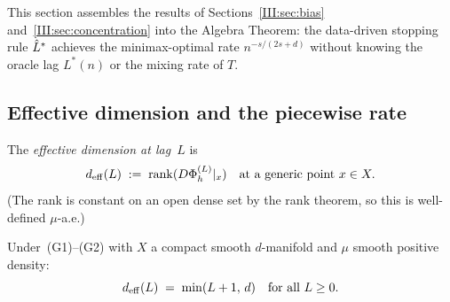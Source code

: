 This section assembles the results of Sections~\ref{III:sec:bias}
and~\ref{III:sec:concentration} into the Algebra Theorem: the data-driven stopping
rule $\hat{L}^*$ achieves the minimax-optimal rate $n^{-s/(2s+d)}$ without knowing
the oracle lag $L^*(n)$ or the mixing rate of $T$.

\subsection{Effective dimension and the piecewise rate}

\begin{definition}
\label{III:def:deff}
The \emph{effective dimension at lag~$L$} is
\[
  d_{\mathrm{eff}}(L) \;:=\; \operatorname{rank}(D\Phi_h^{(L)}|_x)
  \quad\text{at a generic point } x \in X.
\]
(The rank is constant on an open dense set by the rank theorem, so this is
well-defined $\mu$-a.e.)
\end{definition}

\begin{lemma}
\label{III:lem:dimeff}
Under~(G1)--(G2) with $X$ a compact smooth $d$-manifold and $\mu$ smooth
positive density:
\[
  d_{\mathrm{eff}}(L) \;=\; \min(L+1,\, d) \quad \text{for all } L \geq 0.
\]
\end{lemma}

